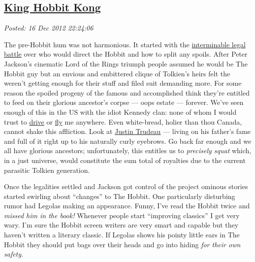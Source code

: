 %

\subsection*{\href{https://bakerjd99.wordpress.com/2012/12/16/king-hobbit-kong/}{King Hobbit Kong}}


\noindent\emph{Posted: 16 Dec 2012 22:24:06}
\vspace{6pt}

The pre-Hobbit hum was not harmonious. It started with the
\href{http://www.nydailynews.com/blogs/pageviews/2012/11/law-of-the-rings-producers-of-the-hobbit-face-epic-legal-battle-alongside-world-pr}{interminable
legal battle} over who would direct the Hobbit and how to split any
spoils. After Peter Jackson's cinematic Lord of the Rings triumph people
assumed he would be The Hobbit guy but an envious and embittered clique
of Tolkien's heirs felt the weren't getting enough for their stuff and
filed suit demanding more. For some reason the spoiled progeny of the
famous and accomplished think they're entitled to feed on their glorious
ancestor's corpse --- oops estate --- forever. We've seen enough of this
in the US with the idiot Kennedy clan: none of whom I would trust to
\href{http://www.washingtonpost.com/wp-srv/politics/special/clinton/frenzy/kennedy.htm}{drive}
or
\href{http://articles.cnn.com/1999-07-21/us/9907\_21\_kennedy.plane.06\_1\_wreckage-piper-saratoga-ii-body?\_s=PM:US}{fly}
me anywhere. Even white-bread, holier than thou Canada, cannot shake
this affliction. Look at
\href{http://www.cbc.ca/news/politics/story/2012/12/03/pol-trudeau-gun-registry-failed-policy.html}{Justin
Trudeau} --- living on his father's fame and full of it right up to his
naturally curly eyebrows. Go back far enough and we all have glorious
ancestors; unfortunately, this entitles us to \emph{precisely squat}
which, in a just universe, would constitute the sum total of royalties
due to the current parasitic Tolkien generation.

Once the legalities settled and Jackson got control of the project
ominous stories started swirling about ``changes'' to The Hobbit. One
particularly disturbing rumor had Legolas making an appearance. Funny,
I've read the Hobbit twice and \emph{missed him in the book!} Whenever
people start ``improving classics'' I get very wary. I'm sure the Hobbit
screen writers are very smart and capable but they haven't written a
literary classic. If Legolas shows his pointy little ears in The Hobbit
they should put bags over their heads and go into hiding \emph{for their
own safety.}

